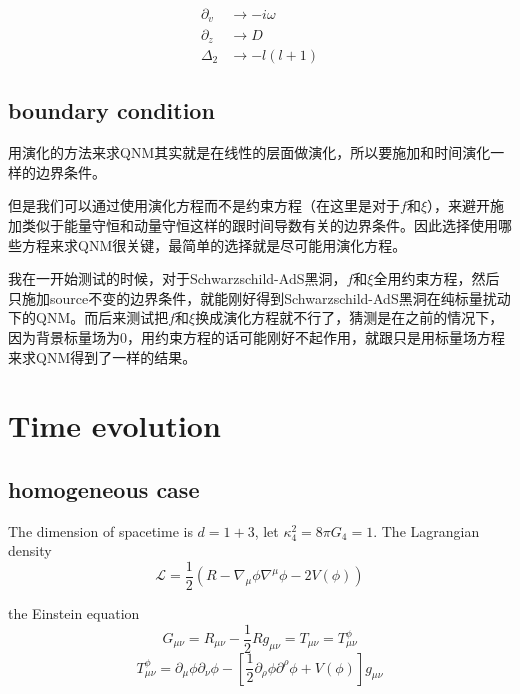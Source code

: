 \documentclass[12pt,a4paper]{ctexart}
\numberwithin{equation}{section}
\begin{document}
\begin{equation}
    \begin{aligned}
        \partial_v&\rightarrow-i\omega\\
        \partial_z&\rightarrow D\\
        \Delta_2&\rightarrow -l(l+1)
    \end{aligned}
\end{equation}

\subsection{boundary condition}

用演化的方法来求QNM其实就是在线性的层面做演化，所以要施加和时间演化一样的边界条件。

但是我们可以通过使用演化方程而不是约束方程（在这里是对于$f$和$\xi$），来避开施加类似于能量守恒和动量守恒这样的跟时间导数有关的边界条件。因此选择使用哪些方程来求QNM很关键，最简单的选择就是尽可能用演化方程。

我在一开始测试的时候，对于Schwarzschild-AdS黑洞，$f$和$\xi$全用约束方程，然后只施加source不变的边界条件，就能刚好得到Schwarzschild-AdS黑洞在纯标量扰动下的QNM。而后来测试把$f$和$\xi$换成演化方程就不行了，猜测是在之前的情况下，因为背景标量场为0，用约束方程的话可能刚好不起作用，就跟只是用标量场方程来求QNM得到了一样的结果。

\section{Time evolution}

\subsection{homogeneous case}

The dimension of spacetime is $d=1+3$, let $\kappa_4^2=8\pi G_4=1$. The Lagrangian density
\begin{equation}
    \mathcal{L}=\frac{1}{2}(R-\nabla_\mu\phi\nabla^\mu\phi-2V(\phi))
\end{equation}

the Einstein equation
\begin{equation}
    G_{\mu\nu}=R_{\mu\nu}-\frac{1}{2}Rg_{\mu\nu}=T_{\mu\nu}=T_{\mu\nu}^\phi
\end{equation}
\begin{equation}
    T_{\mu\nu}^\phi=\partial_\mu\phi\partial_\nu\phi-[\frac{1}{2}\partial_\rho\phi\partial^\rho\phi+V(\phi)]g_{\mu\nu}
\end{equation}
\end{document}
